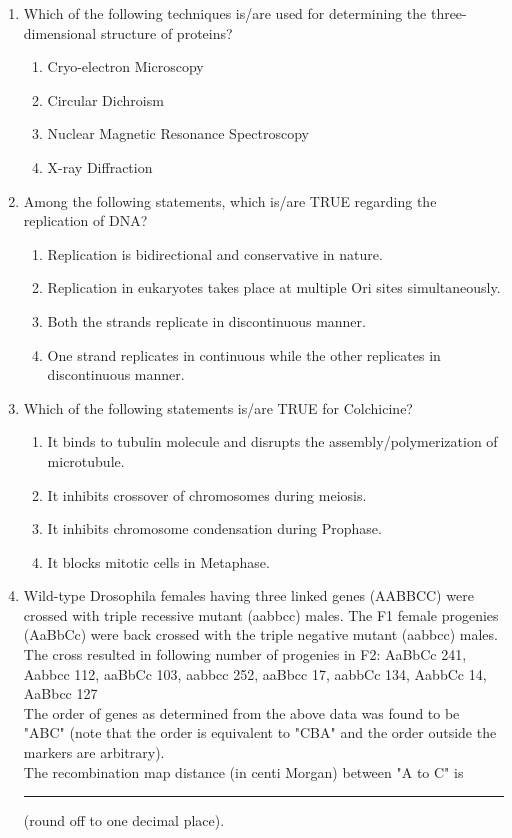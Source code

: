 \documentclass[journal,12pt,onecolumn]{IEEEtran}
\begin{document}
\begin{enumerate}
    \item Which of the following techniques is/are used for determining the three-dimensional structure of proteins?
    \begin{enumerate}
        \item Cryo-electron Microscopy
        \item Circular Dichroism
        \item Nuclear Magnetic Resonance Spectroscopy
        \item X-ray Diffraction
    \end{enumerate}

    \item Among the following statements, which is/are TRUE regarding the replication of DNA?
    \begin{enumerate}
        \item Replication is bidirectional and conservative in nature.
        \item Replication in eukaryotes takes place at multiple Ori sites simultaneously.
        \item Both the strands replicate in discontinuous manner.
        \item One strand replicates in continuous while the other replicates in discontinuous manner.
    \end{enumerate}

    \item Which of the following statements is/are TRUE for Colchicine?
    \begin{enumerate}
        \item It binds to tubulin molecule and disrupts the assembly/polymerization of microtubule.
        \item It inhibits crossover of chromosomes during meiosis.
        \item It inhibits chromosome condensation during Prophase.
        \item It blocks mitotic cells in Metaphase.
    \end{enumerate}

    \item Wild-type Drosophila females having three linked genes (AABBCC) were crossed with triple recessive mutant (aabbcc) males. The F1 female progenies (AaBbCc) were back crossed with the triple negative mutant (aabbcc) males. The cross resulted in following number of progenies in F2: AaBbCc 241, Aabbcc 112, aaBbCc 103, aabbcc 252, aaBbcc 17, aabbCc 134, AabbCc 14, AaBbcc 127\\
    The order of genes as determined from the above data was found to be "ABC" (note that the order is equivalent to "CBA" and the order outside the markers are arbitrary).\\
    The recombination map distance (in centi Morgan) between "A to C" is \rule{1 cm}{0.15 mm} (round off to one decimal place).


\end{enumerate}
\end{document}
